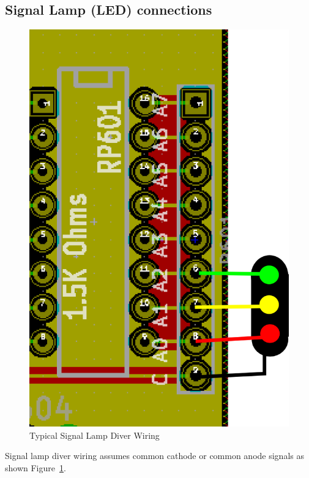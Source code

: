 \clearpage
\subsection{Signal Lamp (LED) connections}

\begin{figure}[hbpt]\begin{centering}%
\includegraphics{ESP32-PWMHalfSidingLampDivers.png}
\caption{Typical Signal Lamp Diver Wiring}
\label{fig:ESP32-PWMHalfSidingLampDivers}
\end{centering}\end{figure}
Signal lamp diver wiring assumes common cathode or common anode signals as 
shown Figure~\ref{fig:ESP32-PWMHalfSidingLampDivers}.  

